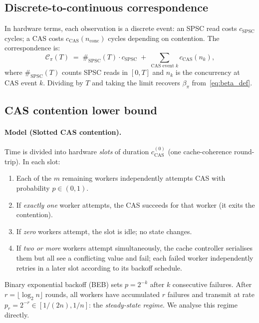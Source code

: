 \documentclass[11pt,a4paper]{article}
\begin{document}
\subsection{Discrete-to-continuous correspondence}

In hardware terms, each observation is a discrete event: an SPSC
read costs $c_{\mathrm{SPSC}}$ cycles; a CAS costs
$c_{\mathrm{CAS}}(n_{\mathrm{conc}})$ cycles depending on contention.
The correspondence is:
\[
  \mathcal{C}_\pi(T)
  \;=\;
  \#_{\mathrm{SPSC}}(T)\cdot c_{\mathrm{SPSC}}
  \;+\;
  \sum_{\text{CAS event }k} c_{\mathrm{CAS}}(n_k),
\]
where $\#_{\mathrm{SPSC}}(T)$ counts SPSC reads in $[0,T]$ and $n_k$
is the concurrency at CAS event $k$.
Dividing by $T$ and taking the limit recovers $\beta_\pi$
from~\eqref{eq:beta_def}.

\subsection{CAS contention lower bound}

\paragraph{Model (Slotted CAS contention).}
Time is divided into hardware \emph{slots} of duration $c_{\mathrm{CAS}}^{(0)}$
(one cache-coherence round-trip).  In each slot:
\begin{enumerate}[label=(\roman*),nosep]
  \item Each of the $m$ remaining workers independently attempts CAS
        with probability $p \in (0,1)$.
  \item If \emph{exactly one} worker attempts, the CAS succeeds for that
        worker (it exits the contention).
  \item If \emph{zero} workers attempt, the slot is idle; no state changes.
  \item If \emph{two or more} workers attempt simultaneously, the cache
        controller serialises them but all see a conflicting value
        and fail; each failed worker independently retries in a later slot
        according to its backoff schedule.
\end{enumerate}
Binary exponential backoff (BEB) sets $p = 2^{-k}$ after $k$ consecutive
failures.  After $r = \lfloor\log_2 n\rfloor$ rounds, all workers have
accumulated $r$ failures and transmit at rate $p_r = 2^{-r} \in [1/(2n), 1/n]$:
the \emph{steady-state regime}.  We analyse this regime directly.
\end{document}
